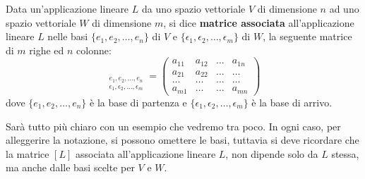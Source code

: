 \begin{defn}
	Data un'applicazione lineare $L$ da uno spazio vettoriale $V$ di
	dimensione $n$ ad uno spazio vettoriale $W$ di dimensione $m$, si dice
	\textbf{matrice associata} all'applicazione lineare $L$ nelle basi
	$\{e_1, e_2, \dots, e_n\}$ di $V$ e
	$\{\epsilon_1, \epsilon_2, \dots, \epsilon_m\}$ di $W$, la seguente
	matrice di $m$ righe ed $n$ colonne:
	\begin{equation*}
		[L]_{\substack{
				e_1, e_2, \dots, e_n\\
				\epsilon_1, \epsilon_2, \dots, \epsilon_m
			}} = \begin{pmatrix}
			a_{11} & a_{12} & \dots & a_{1n} \\
			a_{21} & a_{22} & \dots & \dots  \\
			\dots  & \dots  & \dots & \dots  \\
			a_{m1} & \dots  & \dots & a_{mn}
		\end{pmatrix}
	\end{equation*}
	dove $\{e_1, e_2, \dots, e_n\}$ \`e la base di partenza e
	$\{\epsilon_1, \epsilon_2, \dots, \epsilon_m\}$ \`e la base di arrivo.
\end{defn}

Sar\`a tutto pi\`u chiaro con un esempio che vedremo tra poco. In ogni caso, per
alleggerire la notazione, si possono omettere le basi, tuttavia si deve ricordare che
la matrice $[L]$ associata all'applicazione lineare $L$, non dipende solo da $L$ stessa,
ma anche dalle basi scelte per $V$ e $W$.

